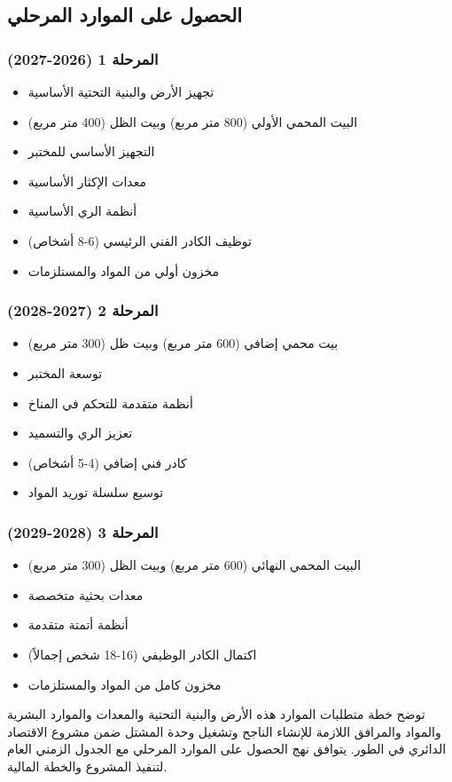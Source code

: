 \subsection{الحصول على الموارد المرحلي}

\subsubsection{المرحلة 1 (2026-2027)}
\begin{itemize}
    \item تجهيز الأرض والبنية التحتية الأساسية
    \item البيت المحمي الأولي (800 متر مربع) وبيت الظل (400 متر مربع)
    \item التجهيز الأساسي للمختبر
    \item معدات الإكثار الأساسية
    \item أنظمة الري الأساسية
    \item توظيف الكادر الفني الرئيسي (6-8 أشخاص)
    \item مخزون أولي من المواد والمستلزمات
\end{itemize}

\subsubsection{المرحلة 2 (2027-2028)}
\begin{itemize}
    \item بيت محمي إضافي (600 متر مربع) وبيت ظل (300 متر مربع)
    \item توسعة المختبر
    \item أنظمة متقدمة للتحكم في المناخ
    \item تعزيز الري والتسميد
    \item كادر فني إضافي (4-5 أشخاص)
    \item توسيع سلسلة توريد المواد
\end{itemize}

\subsubsection{المرحلة 3 (2028-2029)}
\begin{itemize}
    \item البيت المحمي النهائي (600 متر مربع) وبيت الظل (300 متر مربع)
    \item معدات بحثية متخصصة
    \item أنظمة أتمتة متقدمة
    \item اكتمال الكادر الوظيفي (16-18 شخص إجمالاً)
    \item مخزون كامل من المواد والمستلزمات
\end{itemize}

توضح خطة متطلبات الموارد هذه الأرض والبنية التحتية والمعدات والموارد البشرية والمواد والمرافق اللازمة للإنشاء الناجح وتشغيل وحدة المشتل ضمن مشروع الاقتصاد الدائري في الطور. يتوافق نهج الحصول على الموارد المرحلي مع الجدول الزمني العام لتنفيذ المشروع والخطة المالية. 